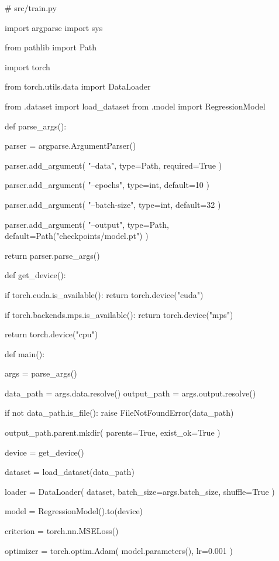 \begin{dhkcode}
# src/train.py

import argparse
import sys

from pathlib import Path

import torch

from torch.utils.data import DataLoader

from .dataset import load_dataset
from .model import RegressionModel


def parse_args():

    parser = argparse.ArgumentParser()

    parser.add_argument(
        "--data",
        type=Path,
        required=True
    )

    parser.add_argument(
        "--epochs",
        type=int,
        default=10
    )

    parser.add_argument(
        "--batch-size",
        type=int,
        default=32
    )

    parser.add_argument(
        "--output",
        type=Path,
        default=Path("checkpoints/model.pt")
    )

    return parser.parse_args()


def get_device():

    if torch.cuda.is_available():
        return torch.device("cuda")

    if torch.backends.mps.is_available():
        return torch.device("mps")

    return torch.device("cpu")


def main():

    args = parse_args()

    data_path = args.data.resolve()
    output_path = args.output.resolve()

    if not data_path.is_file():
        raise FileNotFoundError(data_path)

    output_path.parent.mkdir(
        parents=True,
        exist_ok=True
    )

    device = get_device()

    dataset = load_dataset(data_path)

    loader = DataLoader(
        dataset,
        batch_size=args.batch_size,
        shuffle=True
    )

    model = RegressionModel().to(device)

    criterion = torch.nn.MSELoss()

    optimizer = torch.optim.Adam(
        model.parameters(),
        lr=0.001
    )


\end{dhkcode}
